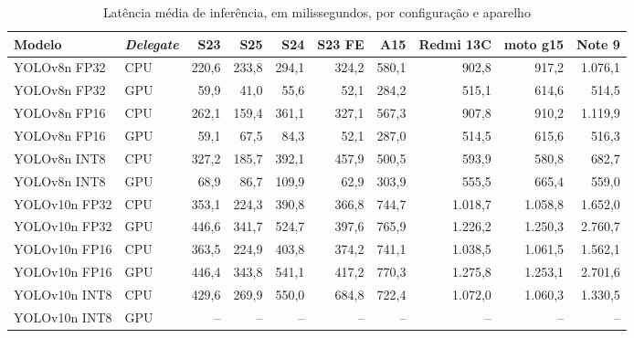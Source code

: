 \begin{table}[H]
\centering
\footnotesize
\setlength{\tabcolsep}{4pt}
\caption{Latência média de inferência, em milissegundos, por
configuração e aparelho}
\label{tab:inferencia_dispositivos}
\begin{tabular}{llrrrrrrrr}
\toprule
\textbf{Modelo} & \textbf{\textit{Delegate}} & \textbf{S23} & \textbf{S25} & \textbf{S24} & \textbf{S23 FE} & \textbf{A15} & \textbf{Redmi 13C} & \textbf{moto g15} & \textbf{Note 9} \\
\midrule
YOLOv8n FP32 & \ac{CPU} & 220,6 & 233,8 & 294,1 & 324,2 & 580,1 & 902,8 & 917,2 & 1.076,1 \\
YOLOv8n FP32 & \ac{GPU} & 59,9 & 41,0 & 55,6 & 52,1 & 284,2 & 515,1 & 614,6 & 514,5 \\
YOLOv8n FP16 & \ac{CPU} & 262,1 & 159,4 & 361,1 & 327,1 & 567,3 & 907,8 & 910,2 & 1.119,9 \\
YOLOv8n FP16 & \ac{GPU} & 59,1 & 67,5 & 84,3 & 52,1 & 287,0 & 514,5 & 615,6 & 516,3 \\
YOLOv8n INT8 & \ac{CPU} & 327,2 & 185,7 & 392,1 & 457,9 & 500,5 & 593,9 & 580,8 & 682,7 \\
YOLOv8n INT8 & \ac{GPU} & 68,9 & 86,7 & 109,9 & 62,9 & 303,9 & 555,5 & 665,4 & 559,0 \\
\midrule
YOLOv10n FP32 & \ac{CPU} & 353,1 & 224,3 & 390,8 & 366,8 & 744,7 & 1.018,7 & 1.058,8 & 1.652,0 \\
YOLOv10n FP32 & \ac{GPU} & 446,6 & 341,7 & 524,7 & 397,6 & 765,9 & 1.226,2 & 1.250,3 & 2.760,7 \\
YOLOv10n FP16 & \ac{CPU} & 363,5 & 224,9 & 403,8 & 374,2 & 741,1 & 1.038,5 & 1.061,5 & 1.562,1 \\
YOLOv10n FP16 & \ac{GPU} & 446,4 & 343,8 & 541,1 & 417,2 & 770,3 & 1.275,8 & 1.253,1 & 2.701,6 \\
YOLOv10n INT8 & \ac{CPU} & 429,6 & 269,9 & 550,0 & 684,8 & 722,4 & 1.072,0 & 1.060,3 & 1.330,5 \\
YOLOv10n INT8 & \ac{GPU} & -- & -- & -- & -- & -- & -- & -- & -- \\
\bottomrule
\end{tabular}
\end{table}
